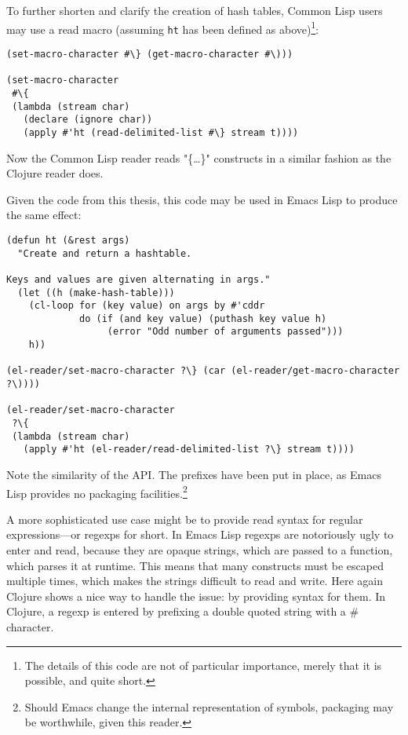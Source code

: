 \documentclass[a4paper]{article}
\begin{document}
To further shorten and clarify the creation of hash tables, Common Lisp users may
use a read macro (assuming \texttt{ht} has been defined as above)\footnote{The
details of this code are not of particular importance, merely that it is
possible, and quite short.}:

\begin{verbatim}
(set-macro-character #\} (get-macro-character #\)))

(set-macro-character
 #\{
 (lambda (stream char)
   (declare (ignore char))
   (apply #'ht (read-delimited-list #\} stream t))))
\end{verbatim}

Now the Common Lisp reader reads "\{\ldots{}\}" constructs in a similar fashion as the
Clojure reader does.

Given the code from this thesis, this code may be used in Emacs Lisp to produce
the same effect:

\begin{verbatim}
(defun ht (&rest args)
  "Create and return a hashtable.

Keys and values are given alternating in args."
  (let ((h (make-hash-table)))
    (cl-loop for (key value) on args by #'cddr
             do (if (and key value) (puthash key value h)
                  (error "Odd number of arguments passed")))
    h))

(el-reader/set-macro-character ?\} (car (el-reader/get-macro-character ?\))))

(el-reader/set-macro-character
 ?\{
 (lambda (stream char)
   (apply #'ht (el-reader/read-delimited-list ?\} stream t))))
\end{verbatim}

Note the similarity of the API.  The prefixes have been put in place, as
Emacs Lisp provides no packaging facilities.\footnote{Should Emacs change the internal
representation of symbols, packaging may be worthwhile, given this reader.}

A more sophisticated use case might be to provide read syntax for regular
expressions---or regexps for short.  In Emacs Lisp regexps are notoriously ugly to
enter and read, because they are opaque strings, which are passed to a function,
which parses it at runtime.  This means that many constructs must be escaped
multiple times, which makes the strings difficult to read and write.  Here again
Clojure shows a nice way to handle the issue: by providing syntax for them.  In
Clojure, a regexp is entered by prefixing a double quoted string with a \#
character.
\end{document}

